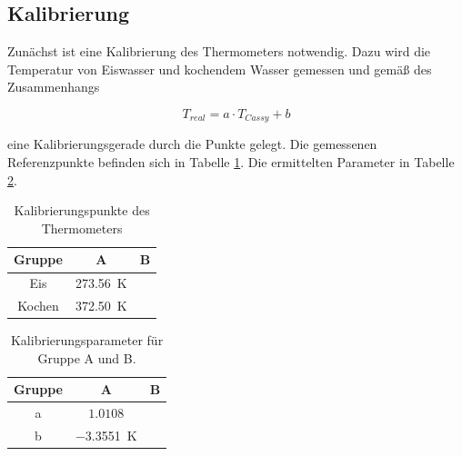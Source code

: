 \documentclass[12pt,a4paper]{article}
\begin{document}
\subsection{Kalibrierung}
Zunächst ist eine Kalibrierung des Thermometers notwendig. Dazu wird die Temperatur von Eiswasser und kochendem Wasser gemessen und gemäß des Zusammenhangs
 
\begin{equation}
T_{real} = a \cdot T_{Cassy} + b
\end{equation}

eine Kalibrierungsgerade durch die Punkte gelegt. Die gemessenen Referenzpunkte befinden sich in Tabelle \ref{tab:Kalibrierung}. Die ermittelten Parameter in Tabelle \ref{tab:Parameter}.

\begin{table}
\centering
\begin{tabular}{|c|c|c|}
\hline
Gruppe & A & B \\
\hline
Eis & \SI{273.56}{\K} & \\
\hline
Kochen & \SI{372.50}{\K} & \\
\hline 
\end{tabular}
\caption{Kalibrierungspunkte des Thermometers}
\label{tab:Kalibrierung}
\end{table}

\begin{table}
\centering
\begin{tabular}{|c|c|c|}
\hline
Gruppe & A & B \\
\hline
a & $1.0108$ & \\
\hline
b & \SI{-3.3551}{\K} & \\
\hline
\end{tabular}
\caption{Kalibrierungsparameter für Gruppe A und B.}
\label{tab:Parameter}
\end{table}
\end{document}

